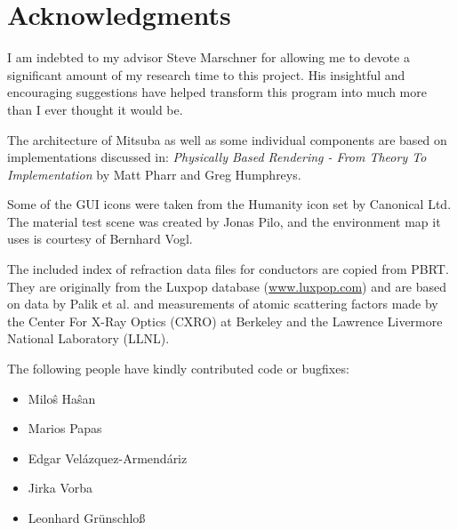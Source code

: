 \section{Acknowledgments}
I am indebted to my advisor Steve Marschner for allowing me to devote
a significant amount of my research time to this project. His insightful and 
encouraging suggestions have helped transform this program into much more than
I ever thought it would be.

The architecture of Mitsuba as well as some individual components are based on 
implementations discussed in: \emph{Physically Based Rendering - From Theory 
To Implementation} by Matt Pharr and Greg Humphreys.

Some of the GUI icons were taken from the Humanity icon set by Canonical Ltd.
The material test scene was created by Jonas Pilo, and the environment map
it uses is courtesy of Bernhard Vogl.

The included index of refraction data files for conductors are copied from
PBRT. They are originally from the Luxpop database (\url{www.luxpop.com}) 
and are based on data by Palik et al. \cite{Palik1998Handbook}
and measurements of atomic scattering factors made by the Center For
X-Ray Optics (CXRO) at Berkeley and the Lawrence Livermore National 
Laboratory (LLNL).

The following people have kindly contributed code or bugfixes:
\begin{itemize}
\item Milo\^{s} Ha\^{s}an
\item Marios Papas
\item Edgar Vel\'{a}zquez-Armend\'{a}riz
\item Jirka Vorba
\item Leonhard Gr\"unschlo\ss
\end{itemize}

